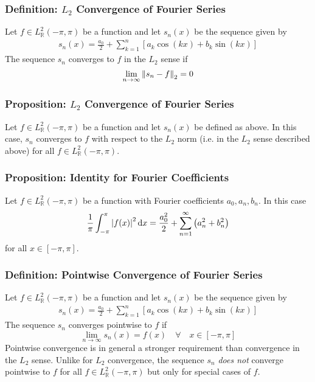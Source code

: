 \documentclass[11pt, a4paper]{article}
\newcommand{\diff}{\mathop{}\!\mathrm{d}} %
\newcommand{\R}{\mathbb{R}} %
\begin{document}
\subsubsection{Definition: $ L_2 $ Convergence of Fourier Series}
Let $ f \in  L^2_{\R}(-\pi, \pi)  $ be a function and let $ s_n(x) $ be the sequence given by
\begin{align*}
	s_n(x) = \frac{a_0}{2} + \sum_{k = 1}^{n} \left[a_k \cos(kx) + b_k \sin(kx) \right]
\end{align*}
The sequence $ s_n $ converges to $ f $ in the $ L_2 $ sense if 
\begin{equation*}
	\lim_{n \to \infty} \norm{s_n - f}_{2} = 0
\end{equation*}

\subsubsection{Proposition: $ L_2 $ Convergence of Fourier Series}
Let $ f \in  L^2_{\R}(-\pi, \pi)  $ be a function and let $ s_n(x) $ be defined as above. In this case, $ s_n $ converges to $ f $ with respect to the $ L_2 $ norm (i.e. in the $ L_2 $ sense described above) for all $ f \in L^2_{\R}(-\pi, \pi) $.


\subsubsection{Proposition: Identity for Fourier Coefficients}
Let $ f \in L^2_{\R}(-\pi, \pi) $ be a function with Fourier coefficients $ a_0, a_n, b_n $. In this case
\begin{equation*}
	\frac{1}{\pi} \int_{-\pi}^{\pi} \abs{f(x)}^2 \diff x = \frac{a_0^2}{2} + \sum_{n = 1}^{\infty} \left(a_n^2 + b_n^2 \right)
\end{equation*}
for all $ x \in [-\pi, \pi] $.

\subsubsection{Definition: Pointwise Convergence of Fourier Series}
Let $ f \in  L^2_{\R}(-\pi, \pi)  $ be a function and let $ s_n(x) $ be the sequence given by
\begin{align*}
	s_n(x) = \frac{a_0}{2} + \sum_{k = 1}^{n} \left[a_k \cos(kx) + b_k \sin(kx) \right]
\end{align*}
The sequence $ s_n $ converges pointwise to $ f $ if
\begin{equation*}
		\lim_{n \to \infty} s_n(x) = f(x) \quad \forall \quad x \in [-\pi, \pi]
\end{equation*}
Pointwise convergence is in general a stronger requirement than convergence in the $ L_2 $ sense. Unlike for $ L_2 $ convergence, the sequence $ s_n $ \textit{does not} converge pointwise to $ f $ for all $ f \in  L^2_{\R}(-\pi, \pi)  $ but only for special cases of $ f $.
\end{document}

